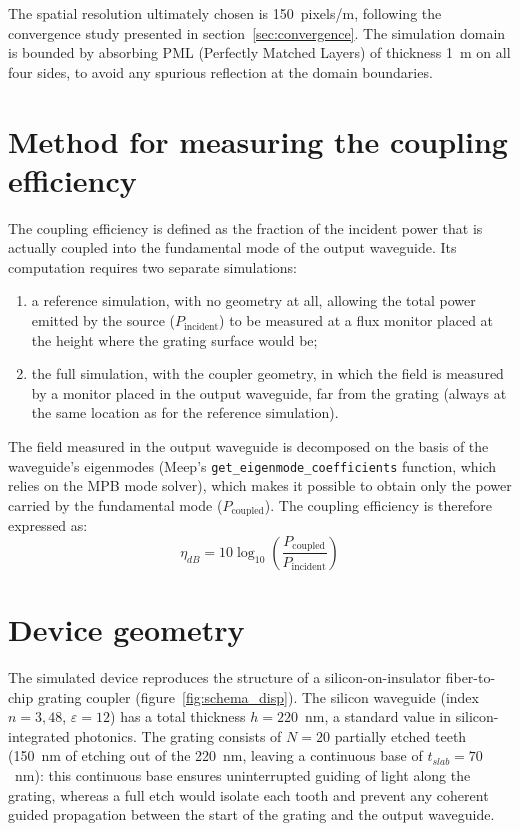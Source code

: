\documentclass[a4paper,11pt]{report}
\begin{document}
The spatial resolution ultimately chosen is 150~pixels/\textmu m, following the convergence study presented in section~\ref{sec:convergence}. The simulation domain is bounded by absorbing PML (Perfectly Matched Layers) of thickness 1~\textmu m on all four sides, to avoid any spurious reflection at the domain boundaries.

\section{Method for measuring the coupling efficiency}

The coupling efficiency is defined as the fraction of the incident power that is actually coupled into the fundamental mode of the output waveguide. Its computation requires two separate simulations:

\begin{enumerate}
    \item a reference simulation, with no geometry at all, allowing the total power emitted by the source ($P_{\text{incident}}$) to be measured at a flux monitor placed at the height where the grating surface would be;
    \item the full simulation, with the coupler geometry, in which the field is measured by a monitor placed in the output waveguide, far from the grating (always at the same location as for the reference simulation).
\end{enumerate}

The field measured in the output waveguide is decomposed on the basis of the waveguide's eigenmodes (Meep's \texttt{get\_eigenmode\_coefficients} function, which relies on the MPB mode solver), which makes it possible to obtain only the power carried by the fundamental mode ($P_{\text{coupled}}$). The coupling efficiency is therefore expressed as:
\begin{equation}
\eta_{dB} = 10\log_{10}\left(\frac{P_{\text{coupled}}}{P_{\text{incident}}}\right)
\label{eq:efficacite}
\end{equation}

\section{Device geometry}

The simulated device reproduces the structure of a silicon-on-insulator fiber-to-chip grating coupler (figure~\ref{fig:schema_disp}). The silicon waveguide (index $n=3{,}48$, $\varepsilon=12$) has a total thickness $h=220$~nm, a standard value in silicon-integrated photonics. The grating consists of $N=20$ partially etched teeth (150~nm of etching out of the 220~nm, leaving a continuous base of $t_{slab}=70$~nm): this continuous base ensures uninterrupted guiding of light along the grating, whereas a full etch would isolate each tooth and prevent any coherent guided propagation between the start of the grating and the output waveguide.
\end{document}
